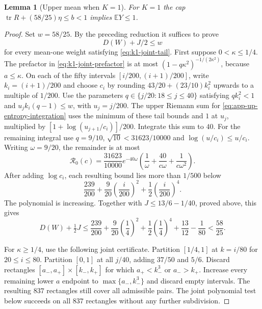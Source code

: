 \documentclass[11pt,a4paper]{article}
\numberwithin{equation}{section}
\newtheorem{lemma}[theorem]{Lemma}
\begin{document}
\begin{lemma}[Upper mean when $K=1$]\label{lem:k1-upper-entropy}
For $K=1$ the cap $\operatorname{tr}R+(58/25)\eta\le b<1$ implies
$\mathbb EY\le1$.
\end{lemma}
\begin{proof}
Set $w=58/25$. By the preceding reduction it suffices to prove
\begin{equation}\label{eq:k1-joint-cost}
 D(W)+J/2\le w
\end{equation}
for every mean-one weight satisfying \eqref{eq:k1-joint-tail}.
First suppose $0<\kappa\le1/4$. The prefactor in
\eqref{eq:k1-joint-prefactor} is at most
$(1-q\kappa^2)^{-1/(2\kappa^2)}$, because $a\le\kappa$.
On each of the fifty intervals $[i/200,(i+1)/200]$, write
$k_i=(i+1)/200$ and choose $c_i$ by rounding
$43/20+(23/10)k_i^2$ upwards to a multiple of $1/200$.
Use the parameters $q\in\{j/20:18\le j\le40\}$ satisfying
$qk_i^2<1$ and $u_jk_i(q-1)\le w$, with $u_j=j/200$.
The upper Riemann sum for \eqref{eq:app-up-entropy-integration} uses the
minimum of these tail bounds and $1$ at $u_j$, multiplied by
$[1+\log(u_{j+1}/c_i)]/200$.
Integrate this sum to $40$. For the remaining integral use
$q=9/10$, $\sqrt{10}<31623/10000$ and $\log(u/c_i)\le u/c_i$.
Writing $\omega=9/20$, the remainder is at most
\begin{equation}\label{eq:k1-entropy-remainder}
 \mathcal R_0(c)=\frac{31623}{10000}e^{-40\omega}
 \left(\frac1\omega+\frac{40}{c\omega}+\frac1{c\omega^2}\right).
\end{equation}
After adding $\log c_i$, each resulting bound lies more than $1/500$ below
\[
 \frac{239}{200}+\frac9{20}\left(\frac i{200}\right)^2
       +\frac12\left(\frac i{200}\right)^4.
\]
The polynomial is increasing. Together with $J\le13/6-1/40$, proved above, this gives
\[
 D(W)+\tfrac12J\le
 \frac{239}{200}+\frac{9}{20}\left(\frac14\right)^2
       +\frac12\left(\frac14\right)^4+\frac{13}{12}-\frac1{80}<\frac{58}{25}.
\]

For $\kappa\ge1/4$, use the following joint certificate.
Partition $[1/4,1]$ at $k=i/80$ for $20\le i\le80$.
Partition $[0,1]$ at all $j/40$, adding $37/50$ and $5/6$.
Discard rectangles $[a_-,a_+]\times[k_-,k_+]$ for which
$a_+<k_-^3$ or $a_->k_+$.
Increase every remaining lower $a$ endpoint to
$\max\{a_-,k_-^3\}$ and discard empty intervals.
The resulting $837$ rectangles still cover all admissible pairs.
The joint polynomial test below succeeds on all $837$ rectangles
without any further subdivision.


\end{proof}
\end{document}
